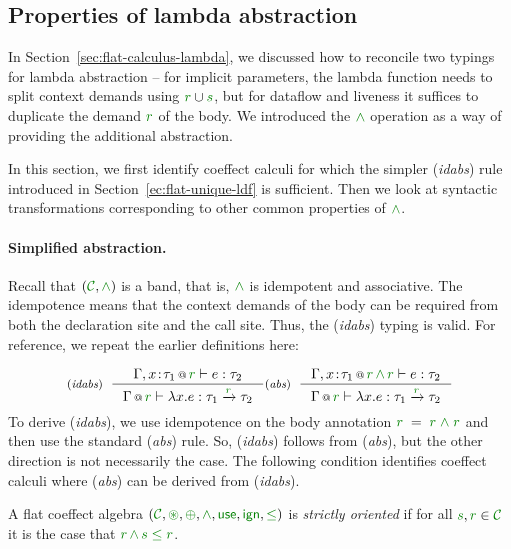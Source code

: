 \subsection{Properties of lambda abstraction}
\label{sec:flat-exts-lambda}

In Section~\ref{sec:flat-calculus-lambda}, we discussed how to reconcile two typings for
lambda abstraction -- for implicit parameters, the lambda function needs to split context
demands using $\cclrd{r} \cup \cclrd{s}$, but for dataflow and liveness it suffices to
duplicate the demand $\cclrd{r}$ of the body. We introduced the $\czip$ operation as
a way of providing the additional abstraction.

In this section, we first identify coeffect calculi for which the simpler (\emph{idabs}) rule
introduced in Section~\ref{ec:flat-unique-ldf} is sufficient. Then we look at syntactic
transformations corresponding to other common properties of $\czip$.

\paragraph{Simplified abstraction.}
Recall that $(\C, \czip)$ is a band, that is, $\czip$  is idempotent and associative. The
idempotence means that the context demands of the body can be required from both the
declaration site and the call site. Thus, the (\emph{idabs}) typing is valid. For reference,
we repeat the earlier definitions here:

\begin{equation*}
\tyrule{idabs}
  {\coctx{\Gamma, x\!:\!\tau_1}{\cclrd{r}} \vdash e : \tau_2}
  {\coctx{\Gamma}{\cclrd{r}} \vdash \lambda x.e : \tau_1 \xrightarrow{\cclrd{r}} \tau_2 }
\tyrule{abs}
  {\coctx{\Gamma, x\!:\!\tau_1}{\cclrd{r}\,\czip\,\cclrd{r}} \vdash e : \tau_2}
  {\coctx{\Gamma}{\cclrd{r}} \vdash \lambda x.e : \tau_1 \xrightarrow{\cclrd{r}} \tau_2 }
\end{equation*}
%
To derive (\emph{idabs}), we use idempotence on the body annotation $\cclrd{r}\;=\;\cclrd{r}\;\czip\;\cclrd{r}$
and then use the standard (\emph{abs}) rule. So, (\emph{idabs}) follows from (\emph{abs}),
but the other direction is not necessarily the case. The following condition identifies
coeffect calculi where (\emph{abs}) can be derived from (\emph{idabs}).

\begin{definition}
A flat coeffect algebra $(\C, \cseq, \cpar, \czip, \cunit, \czero, \cleq)$ is \emph{strictly oriented} if for all
$\cclrd{s}, \cclrd{r} \in \C$ it is the case that $\cclrd{r} \,\czip\, \cclrd{s} \;\cleq\; \cclrd{r}$.
\end{definition}

